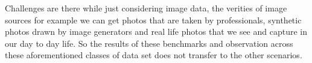 



%


Challenges are there while just considering image data, 
the verities of image sources for example we can get photos that are taken by 
professionals, synthetic photos drawn by image generators and real life photos 
that we see and capture in our day to day life. So the results of these benchmarks and 
observation across these aforementioned classes of data set does not transfer to the other scenarios.


